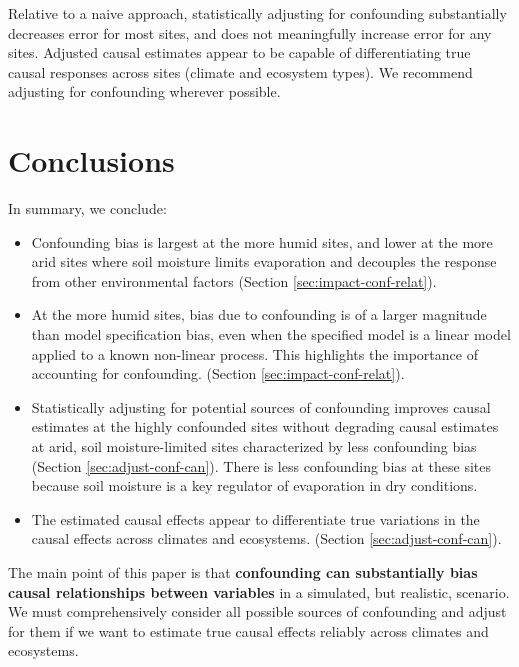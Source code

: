 Relative to a naive approach, statistically adjusting for confounding
substantially decreases error for most sites, and does not meaningfully
increase error for any sites. Adjusted causal estimates appear to be
capable of differentiating true causal responses across sites (climate
and ecosystem types). We recommend adjusting for confounding wherever
possible.

\section{Conclusions}
\label{sec:conclusions}

In summary, we conclude:

  \begin{itemize}
    \item Confounding bias is largest at the more humid sites, and
      lower at the more arid sites where soil moisture limits
      evaporation and decouples the response from other environmental
      factors (Section \ref{sec:impact-conf-relat}).
  \item At the more humid sites, bias due to confounding is of a
    larger magnitude than model specification bias, even when the
    specified model is a linear model applied to a known non-linear
    process. This highlights the importance of accounting for
    confounding. (Section \ref{sec:impact-conf-relat}).
  \item Statistically adjusting for potential sources of confounding
    improves causal estimates at the highly confounded sites without
    degrading causal estimates at arid, soil moisture-limited sites
    characterized by less confounding bias (Section
    \ref{sec:adjust-conf-can}). There is less confounding bias at
    these sites because soil moisture is a key regulator of
    evaporation in dry conditions.

    \item The estimated causal effects appear to differentiate true
      variations in the causal effects across climates and
      ecosystems. (Section \ref{sec:adjust-conf-can}).
  \end{itemize}

The main point of this paper is that \textbf{confounding can
  substantially bias causal relationships between variables} in a
simulated, but realistic, scenario. We must comprehensively consider
all possible sources of confounding and adjust for them if we want
to estimate true causal effects reliably across climates and
ecosystems.
